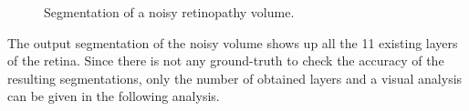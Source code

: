 \begin{figure}[H]
  \centering
  \caption{Segmentation of a noisy retinopathy volume.} 
  \label{fig:setup_retinopathy_segmentation_setup}
\end{figure}

The output segmentation of the noisy volume shows up all the 11 existing layers of the retina. Since there is not any ground-truth to check the accuracy of the resulting segmentations, only the number of obtained layers and a visual analysis can be given in the following analysis.  